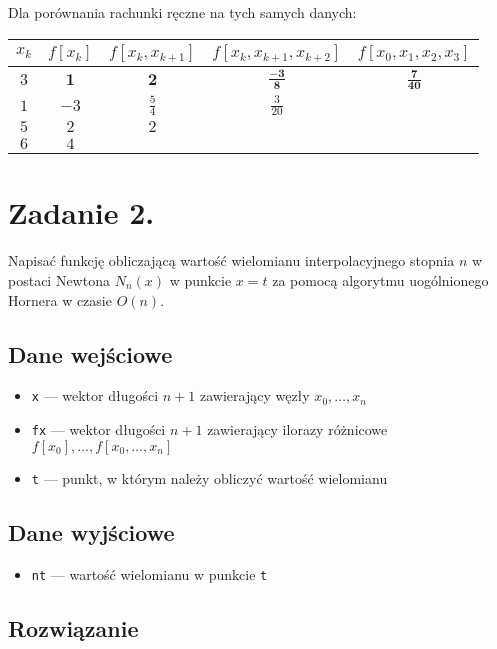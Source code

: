\documentclass[10pt]{article}
\begin{document}
Dla porównania rachunki ręczne na tych samych danych:
\begin{center}
    \begin{tabular}{c | c c c c}
        $x_k$ & $f[x_k]$ & $f[x_k,x_{k+1}]$ & $f[x_k,x_{k+1},x_{k+2}]$ & $f[x_0,x_1,x_2,x_3]$\\
        \hline
        $3$ & $\boldsymbol{1}$ & $\boldsymbol{2}$ & $\boldsymbol{\frac{-3}{8}}$ & $\boldsymbol{\frac{7}{40}}$\\
        $1$ & $-3$ & $\frac{5}{4}$ & $\frac{3}{20}$\\
        $5$ & $2$ & $2$\\
        $6$ & $4$\\
    \end{tabular}
\end{center}


\section{Zadanie 2.}

Napisać funkcję obliczającą wartość wielomianu interpolacyjnego stopnia $n$ w postaci Newtona $N_n(x)$ w punkcie $x = t$ za pomocą algorytmu uogólnionego Hornera w czasie $O(n)$.

\subsection{Dane wejściowe}

\begin{itemize}
    \item \texttt{x} — wektor długości $n+1$ zawierający węzły $x_0,\dots,x_n$
    \item \texttt{fx} — wektor długości $n+1$ zawierający ilorazy różnicowe $f[x_0], \dots, f[x_0,\dots,x_n]$
    \item \texttt{t} — punkt, w którym należy obliczyć wartość wielomianu
\end{itemize}

\subsection{Dane wyjściowe}

\begin{itemize}
    \item \texttt{nt} — wartość wielomianu w punkcie \texttt{t}
\end{itemize}

\subsection{Rozwiązanie}
\end{document}
